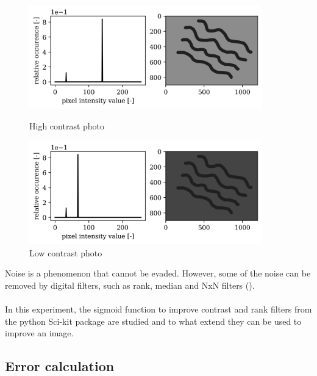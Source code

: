 \begin{figure}[h!]
    \centering
    \begin{minipage}{.5\textwidth}
      \centering
      \includegraphics[width=0.9\textwidth,keepaspectratio]{afbeeldingen/histograms/highcontrast.png}
      \caption{High contrast photo}
      \label{fig:hcphoto}
    \end{minipage}%
    \begin{minipage}{.5\textwidth}
      \centering
      \includegraphics[width=0.9\textwidth,keepaspectratio]{afbeeldingen/histograms/lowcontrast.png}
      \caption{Low contrast photo}
      \label{fig:lcphoto}
    \end{minipage}
\end{figure}

Noise is a phenomenon that cannot be evaded. However, some of the noise can be removed by digital filters, such as rank, median and NxN filters (\cite{tutorial}). \\
\\
In this experiment, the sigmoid function to improve contrast and rank filters from the python Sci-kit package are studied and to what extend they can be used to improve an image.



\subsection{Error calculation}


